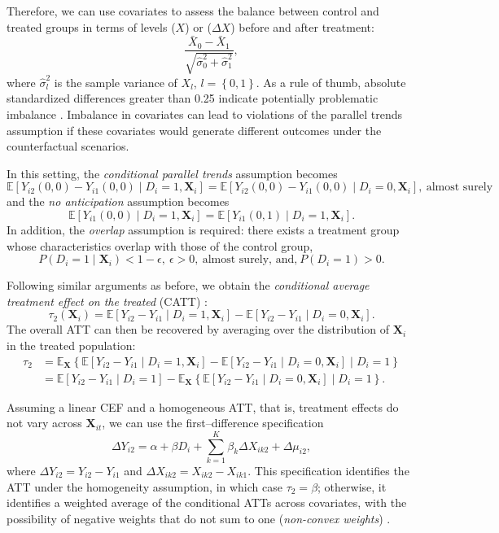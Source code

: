 Therefore, we can use covariates to assess the balance between control and treated groups in terms of levels ($X$) or ($\Delta X$) before and after treatment:
\[
\frac{\bar{X}_0-\bar{X}_1}{\sqrt{\hat{\sigma}_0^2+\hat{\sigma}_1^2}},
\] 
where $\hat{\sigma}_l^2$ is the sample variance of $X_l$, $l=\left\{0,1\right\}$. 
As a rule of thumb, absolute standardized differences greater than 0.25 indicate potentially problematic imbalance \cite{baker2025did_guide}. Imbalance in covariates can lead to violations of the parallel trends assumption if these covariates would generate different outcomes under the counterfactual scenarios.

In this setting, the \textit{conditional parallel trends} assumption becomes
\begin{equation}
	\mathbb{E}[Y_{i2}(0,0) - Y_{i1}(0,0) \mid D_i = 1, \mathbf{X}_i] 
	= \mathbb{E}[Y_{i2}(0,0) - Y_{i1}(0,0) \mid D_i = 0, \mathbf{X}_i], \ \text{almost surely}
\end{equation}
and the \textit{no anticipation} assumption becomes
\begin{equation}
	\mathbb{E}[Y_{i1}(0,0) \mid D_i = 1, \mathbf{X}_i] 
	= \mathbb{E}[Y_{i1}(0,1) \mid D_i = 1, \mathbf{X}_i].
\end{equation} 
In addition, the \textit{overlap} assumption is required: there exists a treatment group whose characteristics overlap with those of the control group,
\[
P(D_i = 1 \mid \mathbf{X}_i) < 1 - \epsilon, \ \epsilon >0, \ \text{almost surely, and,} \ P(D_i=1)>0.
\]

Following similar arguments as before, we obtain the \textit{conditional average treatment effect on the treated} (CATT) \cite{baker2025did_guide}:
\[
\tau_2(\mathbf{X}_i)= \mathbb{E}[Y_{i2} - Y_{i1} \mid D_i = 1, \mathbf{X}_i] - \mathbb{E}[Y_{i2} - Y_{i1} \mid D_i = 0, \mathbf{X}_i].
\]
The overall ATT can then be recovered by averaging over the distribution of $\mathbf{X}_i$ in the treated population:
\begin{align*}
	\tau_2 & = \mathbb{E}_{\mathbf{X}}\left\{\mathbb{E}[Y_{i2} - Y_{i1} \mid D_i = 1, \mathbf{X}_i] - \mathbb{E}[Y_{i2} - Y_{i1} \mid D_i = 0, \mathbf{X}_i] \mid D_i = 1\right\}\\
	&=\mathbb{E}[Y_{i2} - Y_{i1} \mid D_i = 1]-\mathbb{E}_{\mathbf{X}}\left\{\mathbb{E}[Y_{i2} - Y_{i1} \mid D_i = 0, \mathbf{X}_i]\mid D_i=1\right\}.
\end{align*}

Assuming a linear CEF and a homogeneous ATT, that is, treatment effects do not vary across $\mathbf{X}_{it}$, we can use the first–difference specification
\[
\Delta Y_{i2} = \alpha + \beta D_i + \sum_{k=1}^K \beta_k \Delta X_{ik2} + \Delta\mu_{i2},
\]
where $\Delta Y_{i2} = Y_{i2} - Y_{i1}$ and $\Delta X_{ik2} = X_{ik2} - X_{ik1}$. This specification identifies the ATT under the homogeneity assumption, in which case $\tau_2 = \beta$; otherwise, it identifies a weighted average of the conditional ATTs across covariates, with the possibility of negative weights that do not sum to one (\textit{non-convex weights}) \cite{baker2025did_guide}.

